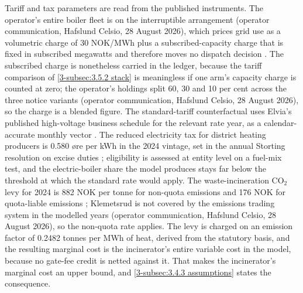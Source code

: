 Tariff and tax parameters are read from the published instruments. The operator's entire boiler fleet is on the interruptible arrangement (operator communication, Hafslund Celsio, 28 August 2026), which prices grid use as a volumetric charge of 30 NOK/MWh plus a subscribed-capacity charge that is fixed in subscribed megawatts and therefore moves no dispatch decision \cite{elvia_dagens_2022}. The subscribed charge is nonetheless carried in the ledger, because the tariff comparison of \autoref{3-subsec:3.5.2 stack} is meaningless if one arm's capacity charge is counted at zero; the operator's holdings split 60, 30 and 10 per cent across the three notice variants (operator communication, Hafslund Celsio, 28 August 2026), so the charge is a blended figure. The standard-tariff counterfactual uses Elvia's published high-voltage business schedule for the relevant rate year, as a calendar-accurate monthly vector \cite{elvia_dagens_2022}. The reduced electricity tax for district heating producers is 0.580 øre per kWh in the 2024 vintage, set in the annual Storting resolution on excise duties \cite{stortinget_stortingsvedtak_nodate}; eligibility is assessed at entity level on a fuel-mix test, and the electric-boiler share the model produces stays far below the threshold at which the standard rate would apply. The waste-incineration CO$_2$ levy for 2024 is 882 NOK per tonne for non-quota emissions and 176 NOK for quota-liable emissions \cite{stortinget_stortingsvedtak_nodate}; Klemetsrud is not covered by the emissions trading system in the modelled years (operator communication, Hafslund Celsio, 28 August 2026), so the non-quota rate applies. The levy is charged on an emission factor of 0.2482 tonnes per MWh of heat, derived from the statutory basis, and the resulting marginal cost is the incinerator's entire variable cost in the model, because no gate-fee credit is netted against it. That makes the incinerator's marginal cost an upper bound, and \autoref{3-subsec:3.4.3 assumptions} states the consequence.


